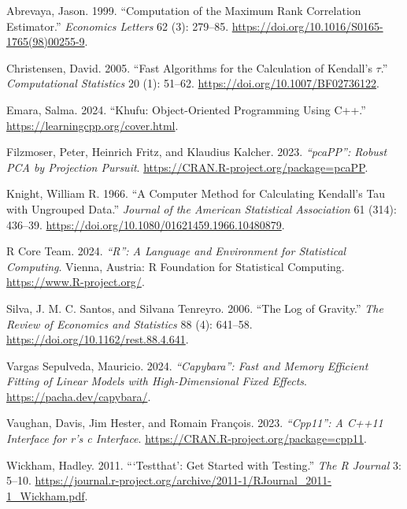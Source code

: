 \documentclass[12pt]{article}
\newlength{\cslhangindent}
\newenvironment{CSLReferences}[2] %
 {\begin{list}{}{%
  \setlength{\itemindent}{0pt}
  \setlength{\leftmargin}{0pt}
  \setlength{\parsep}{0pt}
  \ifodd #1
   \setlength{\leftmargin}{\cslhangindent}
   \setlength{\itemindent}{-1\cslhangindent}
  \fi
  \setlength{\itemsep}{#2\baselineskip}}}
 {\end{list}}
\begin{document}
\label{refs}
\begin{CSLReferences}{1}{0}
Abrevaya, Jason. 1999. {``Computation of the Maximum Rank Correlation
Estimator.''} \emph{Economics Letters} 62 (3): 279--85.
\url{https://doi.org/10.1016/S0165-1765(98)00255-9}.

Christensen, David. 2005. {``Fast Algorithms for the Calculation of
{Kendall}'s \(\tau\).''} \emph{Computational Statistics} 20 (1): 51--62.
\url{https://doi.org/10.1007/BF02736122}.

Emara, Salma. 2024. {``Khufu: {Object}-{Oriented} {Programming} Using
{C}++.''} \url{https://learningcpp.org/cover.html}.

Filzmoser, Peter, Heinrich Fritz, and Klaudius Kalcher. 2023.
\emph{{``pcaPP''}: Robust PCA by Projection Pursuit}.
\url{https://CRAN.R-project.org/package=pcaPP}.

Knight, William R. 1966. {``A {Computer} {Method} for {Calculating}
{Kendall}'s {Tau} with {Ungrouped} {Data}.''} \emph{Journal of the
American Statistical Association} 61 (314): 436--39.
\url{https://doi.org/10.1080/01621459.1966.10480879}.

R Core Team. 2024. \emph{{``R''}: A Language and Environment for
Statistical Computing}. Vienna, Austria: {R} Foundation for Statistical
Computing. \url{https://www.R-project.org/}.

Silva, J. M. C. Santos, and Silvana Tenreyro. 2006. {``The Log of
Gravity.''} \emph{The Review of Economics and Statistics} 88 (4):
641--58. \url{https://doi.org/10.1162/rest.88.4.641}.

Vargas Sepulveda, Mauricio. 2024. \emph{{``Capybara''}: Fast and Memory
Efficient Fitting of Linear Models with High-Dimensional Fixed Effects}.
\url{https://pacha.dev/capybara/}.

Vaughan, Davis, Jim Hester, and Romain François. 2023.
\emph{{``Cpp11''}: A {C++}11 Interface for r's c Interface}.
\url{https://CRAN.R-project.org/package=cpp11}.

Wickham, Hadley. 2011. {``{`Testthat'}: Get Started with Testing.''}
\emph{The R Journal} 3: 5--10.
\url{https://journal.r-project.org/archive/2011-1/RJournal_2011-1_Wickham.pdf}.

\end{CSLReferences}

\end{document}
